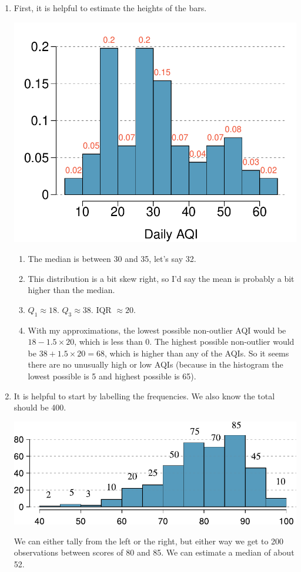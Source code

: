 \documentclass[12pt,letterpaper]{article}
\begin{document}
\begin{enumerate}
\item 
First, it is helpful to estimate the heights of the bars.
\begin{center}
\includegraphics[scale=1]{figures/air_quality_durham_rel_freq_hist_soln}
\end{center}
\begin{enumerate}
\item The median is between 30 and 35, let's say 32.
\item This distribution is a bit skew right, so I'd say the mean is probably a bit higher than the median.
\item $Q_1 \approx 18$. $Q_3 \approx 38$. IQR $\approx 20$.
\item With my approximations, the lowest possible non-outlier AQI would be $18-1.5\times 20$, which is less than 0. The highest possible non-outlier would be $38+1.5\times 20 = 68$, which is higher than any of the AQIs. So it seems there are no unusually high or low AQIs (because in the histogram the lowest possible is 5 and highest possible is 65).
\end{enumerate}

\item It is helpful to start by labelling the frequencies. We also know the total should be 400.
\begin{center}
\includegraphics[scale=1]{figures/estimate_mean_median_simple_sol}
\end{center}
We can either tally from the left or the right, but either way we get to 200 observations between scores of 80 and 85. We can estimate a median of about 52.


\end{enumerate}
\end{document}
